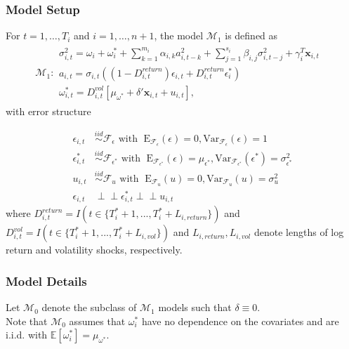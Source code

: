 \documentclass[9pt]{beamer}
\newcommand{\x}{\textbf{x}}
\def\mbf#1{\mathbf{#1}} %
\newcommand{\simiid}{\stackrel{iid}{\sim}} %
\newcommand{\indep}{\perp \!\!\! \perp } %
\def\mrm#1{\mathrm{#1}} %
\def\mc#1{\mathcal{#1}} %
\def\E{\mathbb{E}} %
\def\mc#1{\mathcal{#1}}
\theoremstyle{definition}
\begin{document}
\begin{frame}
\frametitle{Model Setup}

\fontsize{6}{7.2}

For $t= 1, \ldots, T_i$ and $i = 1, \ldots, n+1$, the model $\mc{M}_1$ is defined as 
\begin{align*}
  \mc{M}_1 \colon \begin{array}{l}
     \sigma^{2}_{i,t} = \omega_{i} + \omega^{*}_i + \sum^{m_{i}}_{k=1}\alpha_{i,k}a^{2}_{i,t-k} + \sum_{j=1}^{s_{i}}\beta_{i,j}\sigma_{i,t-j}^{2} + \gamma_{i}^{T} \x_{i,t} \text{ }\\[.2cm]
     a_{i,t} = \sigma_{i,t}((1-D^{return}_{i,t})\epsilon_{i,t} + D^{return}_{i,t}\epsilon^{*}_{i})\\[.2cm]
    \omega_{i,t}^{*} = D^{vol}_{i,t}[\mu_{\omega^{*}}+\delta'\mbf{x}_{i, t}+ u_{i,t}],
  \end{array}
  \end{align*}\label{model_1}
with error structure

  \begin{align*}
    \epsilon_{i,t} &\simiid \mc{F}_{\epsilon} \text{ with }  \; \mrm{E}_{\mc{F}_{\epsilon}}(\epsilon) = 0, \mrm{Var}_{\mc{F}_{\epsilon}}(\epsilon)  = 1  \\
    \epsilon^{*}_{i,t} &\simiid \mc{F}_{\epsilon^{*}} \text{ with }  \; \mrm{E}_{\mc{F}_{\epsilon^{*}}}(\epsilon) = \mu_{\epsilon^{*}}, \mrm{Var}_{\mc{F}_{\epsilon^{*}}}(\epsilon^{*})  = \sigma^2_{\epsilon^{*}}  \\
    u_{i,t} & \simiid  \mc{F}_{u} \text{ with }  \; \mrm{E}_{\mc{F}_{u}}(u) = 0, \mrm{Var}_{\mc{F}_{u}}(u) = \sigma^2_{u}\\
    \epsilon_{i,t} & \indep  \epsilon^{*}_{i,t}  \indep u_{i,t}
    \end{align*}
where $D^{return}_{i,t} = I(t \in \{T_i^* + 1,...,T_i^* + L_{i, return}\})$ and $D^{vol}_{i,t} = I(t \in \{T_i^* + 1,...,T_i^* + L_{i, vol}\})$ and $L_{i,return},L_{i,vol}$ denote lengths of log return and volatility shocks, respectively.  
\end{frame}

\begin{frame}
    \frametitle{Model Details}
    Let $\mc{M}_{0}$ denote the subclass of $\mc{M}_{1}$ models such that $\delta \equiv 0$.  \\
    \bigbreak
    Note that $\mc{M}_{0}$ assumes that $\omega^{*}_i$ have no dependence on the covariates and are i.i.d. with $\E[ \omega^{*}_i]=\mu_{\omega^{*}}$.  
\end{frame}
\end{document}
